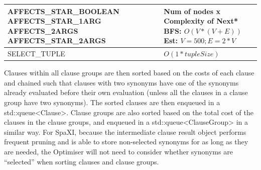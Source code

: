 \documentclass[12pt]{article}
\begin{document}
{{{{{{{{{{{{{\begin{center}
\begin{longtable}{ |L{8cm} | L{9cm}| }
 \\\hline  
\newline
AFFECTS\_STAR\_BOOLEAN\newline
AFFECTS\_STAR\_1ARG\newline
AFFECTS\_2ARGS\newline
AFFECTS\_STAR\_2ARGS\newline
 & 
Num of nodes x Complexity of Next*
BFS: $O(V*(V+E))$
Est: $V = 500; E = 2 * V$

 \\\hline 
\newline
SELECT\_TUPLE
\newline
 & 
$O(1*tupleSize)$
 \\\hline  
\end{longtable}
\end{center}

\normalsize

Clauses within all clause groups are then sorted based on the costs of each clause and chained such that clauses with two synonyms have one of the synonyms already evaluated before their own evaluation (unless all the clauses in a clause group have two synonyms). The sorted clauses are then enqueued in a std::queue<Clause>. Clause groups are also sorted based on the total cost of the clauses in the clause groups, and enqueued in a std::queue<ClauseGroup> in a similar way.
\newline
For SpaXI, because the intermediate clause result object performs frequent pruning and is able to store non-selected synonyms for as long as they are needed, the Optimiser will not need to consider whether synonyms are “selected” when sorting clauses and clause groups.

}}}}}}}}}}}}}
\end{document}
